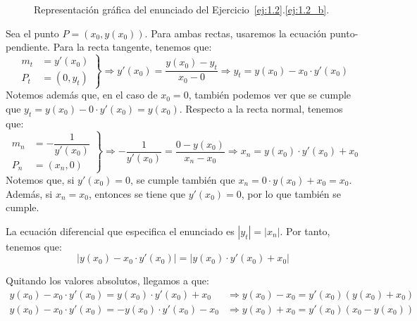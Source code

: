\begin{ejercicio}
\begin{enumerate}
\begin{figure}
            \caption{Representación gráfica del enunciado del Ejercicio~\ref{ej:1.2}.\ref{ej:1.2_b}.}
            \label{fig:ej1.2_b}
        \end{figure}

        Sea el punto \(P=(x_0, y(x_0))\). Para ambas rectas, usaremos la ecuación punto-pendiente. Para la recta tangente, tenemos que:
        \begin{equation*}
            \left. \begin{aligned}
                m_t &= y'(x_0)\\
                P_t &= (0, y_t)
            \end{aligned} \right\} \Longrightarrow y'(x_0) = \dfrac{y(x_0) - y_t}{x_0 - 0}
            \Longrightarrow y_t = y(x_0) - x_0\cdot y'(x_0)
        \end{equation*}
        Notemos además que, en el caso de $x_0=0$, también podemos ver que se cumple que $y_t = y(x_0)-0\cdot y'(x_0) = y(x_0)$. Respecto a la recta normal, tenemos que:
        \begin{equation*}
            \left. \begin{aligned}
                m_n &= -\dfrac{1}{y'(x_0)}\\
                P_n &= (x_n, 0)
            \end{aligned} \right\} \Longrightarrow -\dfrac{1}{y'(x_0)} = \dfrac{0 - y(x_0)}{x_n - x_0}
            \Longrightarrow x_n = y(x_0)\cdot y'(x_0) + x_0
        \end{equation*}
        Notemos que, si $y'(x_0) = 0$, se cumple también que $x_n = 0\cdot y(x_0) + x_0 = x_0$. Además, si $x_n=x_0$, entonces se tiene que $y'(x_0) = 0$, por lo que también se cumple.

        La ecuación diferencial que especifica el enunciado es $|y_t| = |x_n|$. Por tanto, tenemos que:
        \begin{equation*}
            \left| y(x_0) - x_0\cdot y'(x_0) \right| = \left| y(x_0)\cdot y'(x_0) + x_0 \right|
        \end{equation*}

        Quitando los valores absolutos, llegamos a que:
        \begin{align*}
            y(x_0) - x_0\cdot y'(x_0) = y(x_0)\cdot y'(x_0) + x_0
            &\Longrightarrow y(x_0) - x_0 = y'(x_0)\left( y(x_0) + x_0 \right)\\
            y(x_0) - x_0\cdot y'(x_0) = -y(x_0)\cdot y'(x_0) - x_0
            &\Longrightarrow y(x_0) + x_0 = y'(x_0)\left( x_0 -y(x_0)\right)
        \end{align*}


\end{enumerate}
\end{ejercicio}
